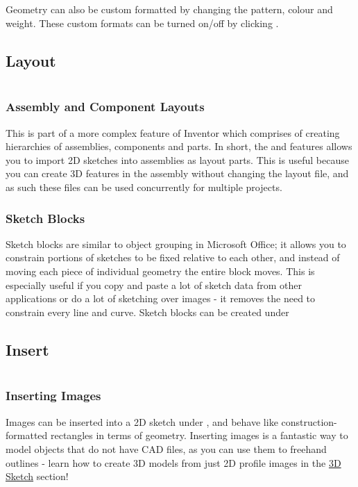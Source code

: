 \begin{enumerate}
Geometry can also be custom formatted by changing the pattern, colour and weight. These custom formats can be turned on/off by clicking .

\subsection{Layout}

$ $

\subsubsection{Assembly and Component Layouts}
This is part of a more complex feature of Inventor which comprises of creating hierarchies of assemblies, components and parts. In short, the  and  features allows you to import 2D sketches into assemblies as layout parts. This is useful because you can create 3D features in the assembly without changing the layout file, and as such these files can be used concurrently for multiple projects.

\subsubsection{Sketch Blocks}
Sketch blocks are similar to object grouping in Microsoft Office; it allows you to constrain portions of sketches to be fixed relative to each other, and instead of moving each piece of individual geometry the entire block moves. This is especially useful if you copy and paste a lot of sketch data from other applications or do a lot of sketching over images - it removes the need to constrain every line and curve. Sketch blocks can be created under 

\subsection{Insert}

$ $

\subsubsection{Inserting Images}
Images can be inserted into a 2D sketch under , and behave like construction-formatted rectangles in terms of geometry. Inserting images is a fantastic way to model objects that do not have CAD files, as you can use them to freehand outlines - learn how to create 3D models from just 2D profile images in the \hyperref[section: 3D Sketches]{3D Sketch} section!


\end{enumerate}
